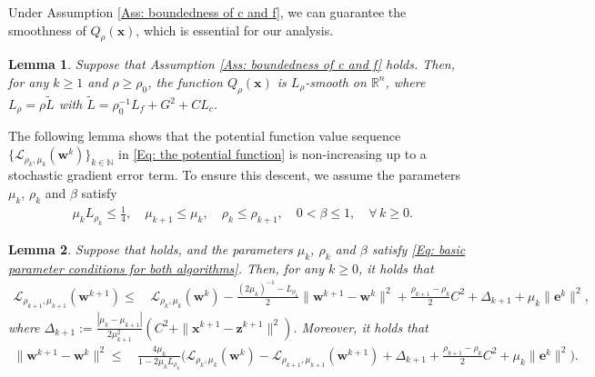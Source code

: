 \documentclass{article}
\theoremstyle{plain}
\newtheorem{lemma}{Lemma}[section]
\theoremstyle{definition}
\theoremstyle{remark}
\newcommand{\RR}{\mathbb{R}}
\newcommand{\NN}{\mathbb{N}}
\newcommand{\bx}{\bm{x}}
\newcommand{\be}{\bm{e}}
\newcommand{\bz}{\bm{z}}
\newcommand{\calL}{\mathcal{L}}
\newcommand{\bw}{\bm{w}}
\numberwithin{equation}{section}
\begin{document}
Under Assumption \ref{Ass: boundedness of c and f}, we can guarantee the smoothness of \(Q_{\rho}(\bx)\), which is essential for our analysis.
\begin{lemma}
    \label{Lemma: smoothness-penalty-function} Suppose that Assumption \ref{Ass: boundedness of c and f} holds.
    Then, for any $k \geq 1$ and $\rho \ge \rho_0$,
    the function
    $Q_{\rho}(\bx)$ is $L_{\rho}$-smooth on $\RR^{n}$, where
    $L_{\rho}= \rho \tilde{L}$ with $\tilde{L}= \rho_0^{-1} L_f+ G^2 + CL_c$.
\end{lemma}
The following lemma shows that the potential function value sequence $\{\calL_{\rho_k, \mu_k}(\bw^k)\}_{k \in \NN}$ in \eqref{Eq: the potential function} is non-increasing up to a stochastic gradient error term. To ensure this descent, we assume the parameters ${\mu_k}$, ${\rho_k}$ and $\beta$ satisfy
\begin{align}
    \label{Eq: basic parameter conditions for both algorithms}
    &\mu_{k}L_{\rho_k} \leq \frac{1}{4}, \quad
    \mu_{k+1} \leq \mu_{k}, \quad
    \rho_{k} \leq \rho_{k+1}, \quad
    0 < \beta \leq 1, \quad \forall\, k \geq 0.
\end{align}

\begin{lemma}
    \label{Lemma: approximate-sufficient-descent}
    Suppose that 
    holds, and the parameters $\mu_{k}$, $\rho_{k}$ and $\beta$ satisfy \eqref{Eq: basic parameter conditions for both algorithms}.
    Then, for any $k \geq 0$, it holds that
    \begin{align}
        \label{eq:approximate-sufficient-descent}
        \calL_{\rho_{k+1}, \mu_{k+1}}(\bw^{k+1}) \leq&\, \calL_{\rho_k, \mu_k}(\bw^{k}) - \frac{(2\mu_{k})^{-1}- L_{\rho_k}}{2}\| \bw^{k+1}- \bw^{k}\|^{2} + \frac{\rho_{k+1}- \rho_{k}}{2}C^{2} + \Delta_{k+1} +  \mu_{k}\| \be^{k}\|^{2},
    \end{align}
where $\Delta_{k+1}
:= \frac{|\mu_{k}-\mu_{k+1}|}{2\mu_{k+1}^2}
(C^{2} + \|\bx^{k+1}-\bz^{k+1}\|^{2})$. Moreover, it holds that
\begin{align}
\label{eq:sequence-residual-bound}
\| \bw^{k+1}- \bw^{k}\|^{2}
\leq&\, \frac{4 \mu_{k}}{1 - 2 \mu_{k}L_{\rho_k}}
   \bigl(
      \calL_{\rho_k, \mu_k}(\bw^{k})
      - \calL_{\rho_{k+1}, \mu_{k+1}}(\bw^{k+1})
      + \Delta_{k+1} + \frac{\rho_{k+1}- \rho_{k}}{2}C^{2}
      + \mu_{k}\| \be^{k}\|^{2}
   \bigr).
\end{align}
\end{lemma}
\end{document}
